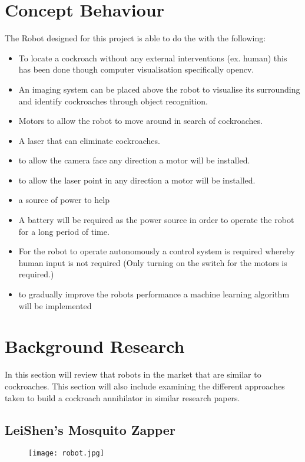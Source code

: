 \documentclass[11pt]{article}
\begin{document}
	\section{Concept Behaviour}
	The Robot designed for this project is able to do the with the following:
	\begin{itemize}
		\item To locate a cockroach without any external interventions (ex. human) this has been done though computer visualisation specifically opencv.
		\item An imaging system can be placed above the robot to visualise its surrounding and identify cockroaches through object recognition.
		
		
		\item Motors to allow the robot to move around in search of cockroaches.
		\item A laser that can eliminate cockroaches.
		\item to allow the camera face any direction a motor will be installed.
		\item to allow the laser point in any direction a motor will be installed.
		\item a source of power to help 
		\item A battery will be required as the power source in order to operate the robot for a long period of time.
		\item For the robot to operate autonomously a control system is required whereby human input is not required (Only turning on the switch for the motors is required.)
		\item to gradually improve the robots performance a machine learning algorithm will be implemented
		
	\end{itemize}
	
	
	\section{Background Research}
	
	
	
	
	In this section will review that robots in the market that are similar to cockroaches. This section will also include examining the different approaches taken to build a cockroach annihilator in similar  research papers.
	\subsection{LeiShen's Mosquito Zapper}
	\begin{center}
		\begin{figure}[H]
			\centering
			\texttt{[image: robot.jpg]}
			
		\end{figure}
	\end{center}
	
\end{document}
